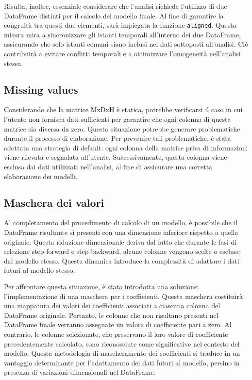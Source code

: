 \documentclass[a4paper,10pt]{article}
\begin{document}
Risulta, inoltre, essenziale considerare che l'analisi richiede l'utilizzo di due DataFrame distinti per il calcolo del modello finale. 
Al fine di garantire la congruità tra questi due elementi, sarà impiegata la funzione \texttt{aligned}. Questa misura mira a sincronizzare 
gli istanti temporali all'interno dei due DataFrame, assicurando che solo istanti comuni siano inclusi nei dati sottoposti all'analisi. 
Ciò contribuirà a evitare conflitti temporali e a ottimizzare l'omogeneità nell'analisi stessa.

\subsection{Missing values}

Considerando che la matrice MxDxH è statica, potrebbe verificarsi il caso in cui l'utente non fornisca dati sufficienti per garantire che ogni 
colonna di questa matrice sia diversa da zero. Questa situazione potrebbe generare problematiche durante il processo di elaborazione. 
Per prevenire tali problematiche, è stata adottata una strategia di default: ogni colonna della matrice priva di informazioni viene rilevata e segnalata 
all'utente. Successivamente, questa colonna viene esclusa dai dati utilizzati nell'analisi, al fine di assicurare una corretta elaborazione dei modelli.

\subsection{Maschera dei valori}

Al completamento del procedimento di calcolo di un modello, è possibile che il DataFrame risultante si presenti con una dimensione inferiore rispetto
a quella originale. Questa riduzione dimensionale deriva dal fatto che durante le fasi di selezione step-forward e step-backward, alcune colonne vengono 
scelte o escluse dal modello stesso. Questa dinamica introduce la complessità di adattare i dati futuri al modello stesso.

Per affrontare questa situazione, è stata introdotta una soluzione: l'implementazione di una maschera per i coefficienti. 
Questa maschera costituirà una mappatura dei valori dei coefficienti associati a ciascuna colonna del DataFrame originale. 
Pertanto, le colonne che non risultano presenti nel DataFrame finale verranno assegnate un valore di coefficiente pari a zero. Al contrario, le colonne 
selezionate, che preservano il loro valore di coefficiente precedentemente calcolato, sono riconosciute come significative nel contesto del modello. 
Questa metodologia di mascheramento dei coefficienti si traduce in un vantaggio determinante per l'adattamento dei dati futuri al modello, 
persino in presenza di variazioni dimensionali nel DataFrame.
\end{document}
